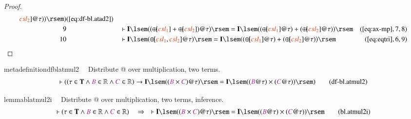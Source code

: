 \begin{proof}
\begin{align}
      \msc{csl_2} ] @ \tau ) ) \rsem
      )&(\mbox{\ref{eq:df-bl.atad2}})\notag
  \\ 9 &&  & \vdash \mathbf{I} \lsem ( ( {\oplus\hspace{-1pt}[} \msc{csl_1} ] +
      {\oplus\hspace{-1pt}[} \msc{csl_2} ] ) @ \tau ) \rsem
      = \mathbf{I} \lsem ( ( {\oplus\hspace{-1pt}[}
      \msc{csl_1} ] @ \tau ) + ( {\oplus\hspace{-1pt}[}
      \msc{csl_2} ] @ \tau ) )
      \rsem&(\mbox{\ref{eq:ax-mp}},7,8)\notag
  \\ 10 &&  & \vdash \mathbf{I} \lsem ( {\oplus\hspace{-1pt}[} \msc{csl_1} ,
      \msc{csl_2} ] @ \tau ) \rsem = \mathbf{I} \lsem ( (
      {\oplus\hspace{-1pt}[} \msc{csl_1} ] @ \tau ) + (
      {\oplus\hspace{-1pt}[} \msc{csl_2} ] @ \tau ) )
      \rsem&(\mbox{\ref{eq:eqtri}},6,9)\notag
\end{align}
\end{proof}

\begin{restatable}{metadefinition}{dfblatmul2}~~ Distribute @ over multiplication,
two terms.
\begin{align}
\vdash ( ( \tau \in \mathbf{T} \wedge \mc{B} \in \mathbb{R} \wedge \mc{C} \in
    \mathbb{R} ) \rightarrow \mathbf{I} \lsem ( ( \mc{B} \times \mc{C} ) @ \tau
    ) \rsem = \mathbf{I} \lsem ( ( \mc{B} @ \tau ) \times ( \mc{C} @ \tau ) )
    \rsem )\label{eq:df-bl.atmul2}\tag{df-bl.atmul2}
\end{align}
\end{restatable}

\begin{restatable}{lemma}{blatmul2i}~~ Distribute @ over multiplication, two
terms, inference.
\begin{align}
\vdash ( \tau \in \mathbf{T} \wedge \mc{B} \in \mathbb{R} \wedge \mc{C} \in
    \mathbb{R} )\quad\Rightarrow\quad \vdash \mathbf{I} \lsem ( ( \mc{B} \times
    \mc{C} ) @ \tau ) \rsem = \mathbf{I} \lsem ( ( \mc{B} @ \tau ) \times (
    \mc{C} @ \tau ) ) \rsem\label{eq:bl.atmul2i}\tag{bl.atmul2i}
\end{align}
\end{restatable}

